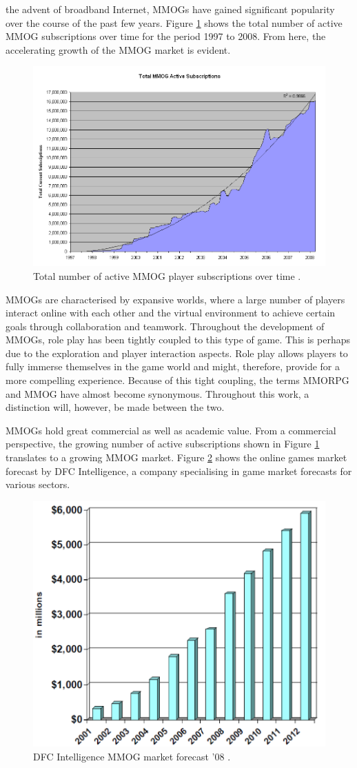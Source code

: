 \documentclass[journal,oneside,a4paper,onecolumn]{IEEEtran}
\begin{document}
 the advent of broadband Internet, \acp{MMOG} have gained significant popularity over the course of the past few years.
Figure \ref{fig_mmog_subscriptions} shows the total number of active MMOG subscriptions over time for the period 1997 to 2008. From here, the accelerating growth of the MMOG market is evident.
%
\begin{figure}[htbp]
 \centering
 \includegraphics[width=0.7\columnwidth]{MMOG_subscriptions}
 \caption{Total number of active MMOG player subscriptions over time \cite{mmo_growth_chart}.}
 \label{fig_mmog_subscriptions}
\end{figure}

\acp{MMOG} are characterised by expansive worlds, where a large number of players interact online with each other and the virtual environment to achieve certain goals through collaboration and teamwork. Throughout the development of \acp{MMOG}, role play has been tightly coupled to this type of game. This is perhaps due to the exploration and player interaction aspects. Role play allows players to fully immerse themselves in the game world and might, therefore, provide for a more compelling experience. Because of this tight coupling, the terms \ac{MMORPG} and \ac{MMOG} have almost become synonymous. Throughout this work, a distinction will, however, be made between the two.

\acp{MMOG} hold great commercial as well as academic value. From a commercial perspective, the growing number of active subscriptions shown in Figure \ref{fig_mmog_subscriptions} translates to a growing \ac{MMOG} market. Figure \ref{fig_mmog_market} shows the online games market forecast by DFC Intelligence, a company specialising in game market forecasts for various sectors.
%
\begin{figure}[htbp]
 \centering
 \includegraphics[width=0.4\columnwidth]{DFC_MMOG_market}
 \caption{DFC Intelligence MMOG market forecast '08 \cite{Fan_phd}.}
 \label{fig_mmog_market}
\end{figure}
\end{document}
